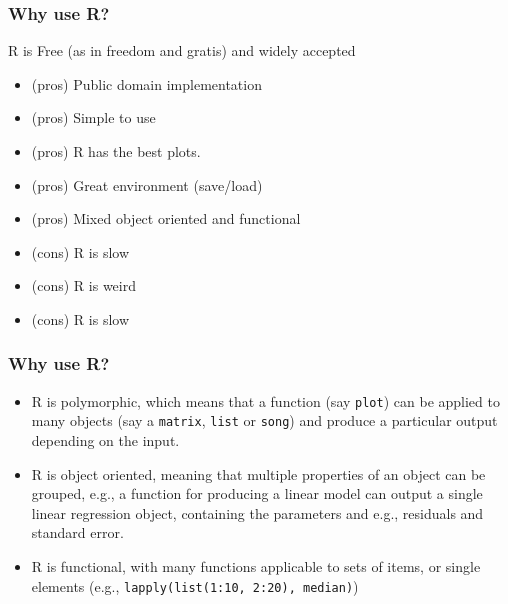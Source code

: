 \documentclass[]{beamer}
\begin{document}
\begin{frame}
  \frametitle{Why use R?}

  R is Free (as in freedom and gratis) and widely accepted

  \begin{itemize}
  \item (pros) Public domain implementation
  \item (pros) Simple to use
  \item (pros) R has the best plots.
  \item (pros) Great environment (save/load)
  \item (pros) Mixed object oriented and functional
  \item (cons) R is slow
  \item (cons) R is weird
  \item (cons) R is slow
  \end{itemize}
\end{frame}

\begin{frame}
  \frametitle{Why use R?}
  
  \begin{itemize}
  \item R is polymorphic, which means that a function (say
    \texttt{plot}) can be applied to many objects (say a
    \texttt{matrix}, \texttt{list} or \texttt{song}) and produce a
    particular output depending on the input.

  \item R is object oriented, meaning that multiple properties of an
    object can be grouped, e.g., a function for producing a linear
    model can output a single linear regression object, containing the
    parameters and e.g., residuals and standard error.
    
  \item R is functional, with many functions applicable to sets of
    items, or single elements (e.g., \texttt{lapply(list(1:10, 2:20), median)})
  \end{itemize}
\end{frame}
\end{document}
